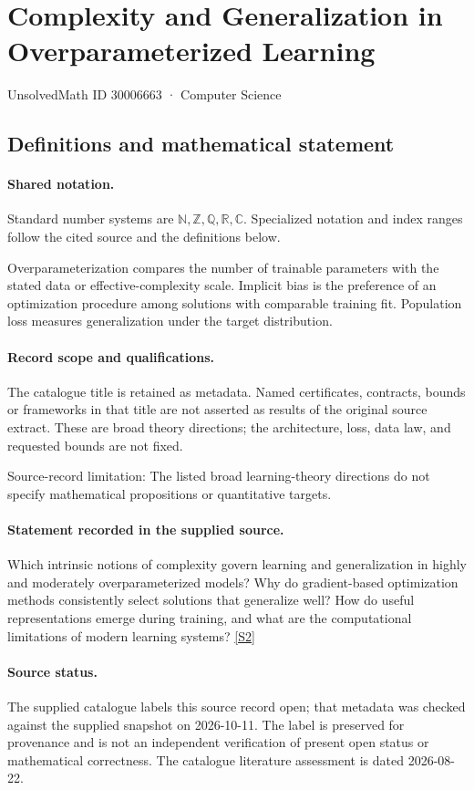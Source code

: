 \documentclass[11pt]{article}
\newcommand{\sref}[2]{\hyperlink{source:#1:#2}{[S#2]}}
\begin{document}
\setcounter{section}{30006662}
\section{Complexity and Generalization in Overparameterized Learning}\label{30006663}
{\small\sffamily UnsolvedMath ID 30006663 · Computer Science}
\subsection{Definitions and mathematical statement}

\paragraph{Shared notation.}Standard number systems are $\mathbb N,\mathbb Z,\mathbb Q,\mathbb R,\mathbb C$. Specialized notation and index ranges follow the cited source and the definitions below.


Overparameterization compares the number of trainable parameters with the stated data or effective-complexity scale. Implicit bias is the preference of an optimization procedure among solutions with comparable training fit. Population loss measures generalization under the target distribution.
\paragraph{Record scope and qualifications.}
The catalogue title is retained as metadata. Named certificates, contracts, bounds or frameworks in that title are not asserted as results of the original source extract.
These are broad theory directions; the architecture, loss, data law, and requested bounds are not fixed.

Source-record limitation: The listed broad learning-theory directions do not specify mathematical propositions or quantitative targets.
\paragraph{Statement recorded in the supplied source.}
Which intrinsic notions of complexity govern learning and generalization in highly and moderately overparameterized models? Why do gradient-based optimization methods consistently select solutions that generalize well? How do useful representations emerge during training, and what are the computational limitations of modern learning systems? \sref{30006663}{2}
\paragraph{Source status.}
The supplied catalogue labels this source record open; that metadata was checked against the supplied snapshot on 2026-10-11. The label is preserved for provenance and is not an independent verification of present open status or mathematical correctness. The catalogue literature assessment is dated 2026-08-22.
\end{document}
